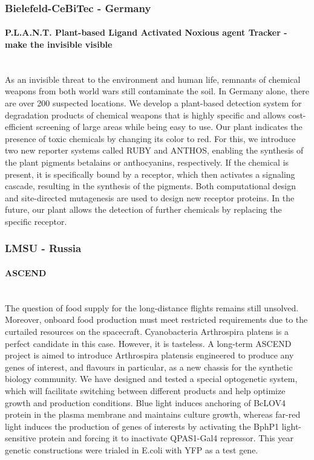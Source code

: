 \subsubsection*{Bielefeld-CeBiTec - Germany}
\paragraph{P.L.A.N.T. Plant-based Ligand Activated Noxious agent Tracker - make the invisible visible}\mbox{} \\
As an invisible threat to the environment and human life, remnants of chemical weapons from both world wars still contaminate the soil. In Germany alone, there are over 200 suspected locations. We develop a plant-based detection system for degradation products of chemical weapons that is highly specific and allows cost-efficient screening of large areas while being easy to use. Our plant indicates the presence of toxic chemicals by changing its color to red. For this, we introduce two new reporter systems called RUBY and ANTHOS, enabling the synthesis of the plant pigments betalains or anthocyanins, respectively. If the chemical is present, it is specifically bound by a receptor, which then activates a signaling cascade, resulting in the synthesis of the pigments. Both computational design and site-directed mutagenesis are used to design new receptor proteins. In the future, our plant allows the detection of further chemicals by replacing the specific receptor.

\subsubsection*{LMSU - Russia}
\paragraph{ASCEND}\mbox{} \\
The question of food supply for the long-distance flights remains still unsolved. Moreover, onboard food production must meet restricted requirements due to the curtailed resources on the spacecraft. Сyanobacteria Arthrospira platens is a perfect candidate in this case. However, it is tasteless. A long-term ASCEND project is aimed to introduce Arthrospira platensis engineered to produce any genes of interest, and flavours in particular, as a new chassis for the synthetic biology community. We have designed and tested a special optogenetic system, which will facilitate switching between different products and help optimize growth and production conditions. Blue light induces anchoring of BcLOV4 protein in the plasma membrane and maintains culture growth, whereas far-red light induces the production of genes of interests by activating the BphP1 light-sensitive protein and forcing it to inactivate QPAS1-Gal4 repressor. This year genetic constructions were trialed in E.coli with YFP as a test gene.

